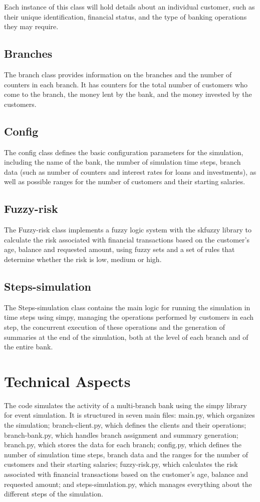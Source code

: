 \documentclass[titlepage, 12pt]{article}
\begin{document}
Each instance of this class will hold details about an individual customer, such as their unique identification, financial status, and the type of banking operations they may require.

\subsection{Branches}
The branch class provides information on the branches and the number of counters in each branch. It has counters for the total number of customers who come to the branch, the money lent by the bank, and the money invested by the customers.

\subsection{Config}
The config class defines the basic configuration parameters for the simulation, including the name of the bank, the number of simulation time steps, branch data (such as number of counters and interest rates for loans and investments), as well as possible ranges for the number of customers and their starting salaries.

\subsection{Fuzzy-risk}
The Fuzzy-risk class implements a fuzzy logic system with the skfuzzy library to calculate the risk associated with financial transactions based on the customer's age, balance and requested amount, using fuzzy sets and a set of rules that determine whether the risk is low, medium or high.

\subsection{Steps-simulation}
The Steps-simulation class contains the main logic for running the simulation in time steps using simpy, managing the operations performed by customers in each step, the concurrent execution of these operations and the generation of summaries at the end of the simulation, both at the level of each branch and of the entire bank.

\newpage

\section{Technical Aspects}
The code simulates the activity of a multi-branch bank using the simpy library for event simulation. It is structured in seven main files: main.py, which organizes the simulation; branch-client.py, which defines the clients and their operations; branch-bank.py, which handles branch assignment and summary generation; branch.py, which stores the data for each branch; config.py, which defines the number of simulation time steps, branch data and the ranges for the number of customers and their starting salaries; fuzzy-risk.py, which calculates the risk associated with financial transactions based on the customer's age, balance and requested amount; and steps-simulation.py, which manages everything about the different steps of the simulation.
\end{document}
